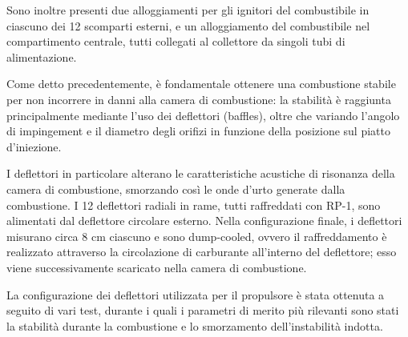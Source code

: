 Sono inoltre presenti due alloggiamenti per gli ignitori del combustibile in ciascuno dei 12 scomparti esterni, e un alloggiamento del combustibile nel compartimento centrale, tutti collegati al collettore da singoli tubi di alimentazione.

Come detto precedentemente, è fondamentale ottenere una combustione stabile per non incorrere in danni alla camera di combustione: la stabilità è raggiunta principalmente mediante l’uso dei deflettori (baffles), oltre che variando l’angolo di impingement e il diametro degli orifizi in funzione della posizione sul piatto d’iniezione.

I deflettori in particolare alterano le caratteristiche acustiche di risonanza della camera di combustione, smorzando così le onde d’urto generate dalla combustione. I 12 deflettori radiali in rame, tutti raffreddati con RP-1, sono alimentati dal deflettore circolare esterno. Nella configurazione finale, i deflettori misurano circa 8 cm ciascuno e sono dump-cooled, ovvero il raffreddamento è realizzato attraverso la circolazione di carburante all’interno del deflettore; esso viene successivamente scaricato nella camera di combustione.

La configurazione dei deflettori utilizzata per il propulsore è stata ottenuta a seguito di vari test, durante i quali i parametri di merito più rilevanti sono stati la stabilità durante la combustione e lo smorzamento dell’instabilità indotta.